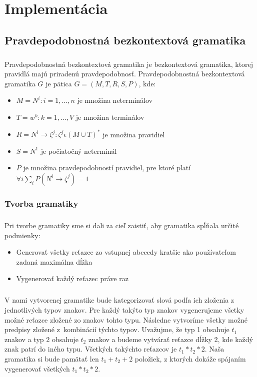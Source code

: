\chapter{Implementácia}

\section{Pravdepodobnostná bezkontextová gramatika}
\paragraph{}
Pravdepodobnostná bezkontextová gramatika je bezkontextová gramatika, ktorej pravidlá majú priradenú pravdepodobnosť. Pravdepodobnostná bezkontextová gramatika \(G\) je pätica \(G = (M, T, R, S, P)\), kde:
\begin{itemize}
	\item \(M = { N^i : i = 1,...,n }\) je množina neterminálov
	\item \(T = { w^k : k = 1,...,V }\) je množina terminálov
	\item \(R = { N^i \to \zeta^j : \zeta^j \epsilon (M \cup T)^* }\) je množina pravidiel
	\item \(S = N^1\) je počiatočný neterminál
	\item \(P\) je množina pravdepodobností pravidiel, pre ktoré platí \( \forall i \displaystyle\sum_{i} P(N^i \to \zeta^j) = 1\)
\end{itemize}

\subsection{Tvorba gramatiky}
\paragraph{}
Pri tvorbe gramatiky sme si dali za cieľ zaistiť, aby gramatika spĺňala určité podmienky:
\begin{itemize}
	\item Generovať všetky reťazce zo vstupnej abecedy kratšie ako používateľom zadaná maximálna dĺžka
	\item Vygenerovať každý reťazec práve raz
\end{itemize}

\paragraph{}
V nami vytvorenej gramatike bude kategorizovať slová podľa ich zloženia z jednotlivých typov znakov. Pre každý takýto typ znakov vygenerujeme všetky možné reťazce zložené zo znakov tohto typu. Následne vytvoríme všetky možné predpisy zložené z~kombinácií týchto typov. Uvažujme, že typ 1 obsahuje \(t_1\) znakov a typ 2 obsahuje \(t_2\) znakov a budeme vytvárať reťazce dĺžky 2, kde každý znak patrí do iného typu. Všetkých takýchto reťazcov je \(t_1 * t_2 * 2\). Naša gramatika si bude pamätať len \(t_1 + t_2 + 2\) položiek, z ktorých dokáže spájaním vygenerovať všetkých \(t_1 * t_2 * 2\).

